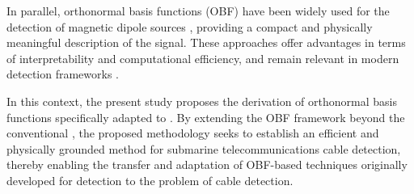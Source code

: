In parallel, orthonormal basis functions (OBF) have been widely used for the detection of magnetic dipole sources \cite{Otnes2007,liu2024adaptive}, providing a compact and physically meaningful description of the signal. These approaches offer advantages in terms of interpretability and computational efficiency, and remain relevant in modern detection frameworks \cite{https://doi.org/10.1049/rsn2.70091,fan2020adaptive,guo2024obf}. 

In this context, the present study proposes the derivation of orthonormal basis functions specifically adapted to . By extending the OBF framework beyond the conventional , the proposed methodology seeks to establish an efficient and physically grounded method for submarine telecommunications cable detection, thereby enabling the transfer and adaptation of OBF-based techniques originally developed for  detection to the problem of cable detection.